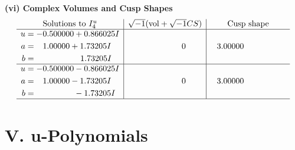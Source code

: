 \documentclass[1p]{elsarticle_modified}
\theoremstyle{definition}
\newcommand{\I}{\sqrt{-1}}
\begin{document}
\newpage\flushleft \textbf{(vi) Complex Volumes and Cusp Shapes}
$$\begin{array}{c|c|c}  
\text{Solutions to }I^u_{4}& \I (\text{vol} + \sqrt{-1}CS) & \text{Cusp shape}\\
 \hline 
\begin{aligned}
u &= -0.500000 + 0.866025 I \\
a &= \phantom{-}1.00000 + 1.73205 I \\
b &= \phantom{-0.000000 -}1.73205 I\end{aligned}
 & \phantom{-0.000000 } 0 & \phantom{-}3.00000\phantom{ +0.000000I} \\ \hline\begin{aligned}
u &= -0.500000 - 0.866025 I \\
a &= \phantom{-}1.00000 - 1.73205 I \\
b &= \phantom{-0.000000 } -1.73205 I\end{aligned}
 & \phantom{-0.000000 } 0 & \phantom{-}3.00000\phantom{ +0.000000I}\\
 \hline 
 \end{array}$$\newpage
\newpage\renewcommand{\arraystretch}{1}
\centering \section*{ V. u-Polynomials}
\end{document}
